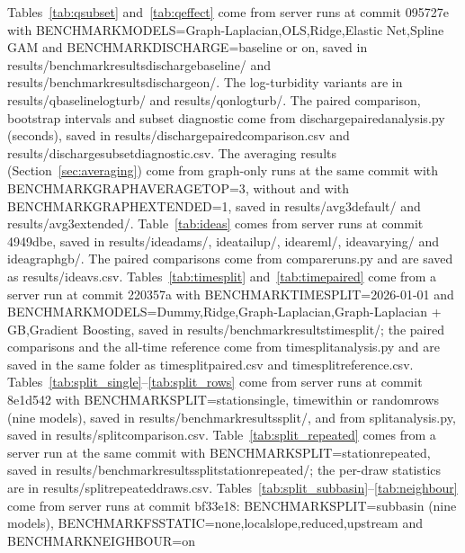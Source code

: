 \documentclass[11pt]{article}
\newcommand{\codeus}{\textunderscore\allowbreak}
\newcommand{\code}[1]{{\ttfamily\let\_\codeus #1}}
\begin{document}
Tables~\ref{tab:qsubset} and~\ref{tab:qeffect} come from server runs at commit \code{095727e}
with \code{BENCHMARK\_MODELS=Graph-Laplacian,OLS,Ridge,Elastic Net,Spline GAM} and
\code{BENCHMARK\_DISCHARGE=baseline} or \code{on}, saved in
\code{results/benchmark\_results\_discharge\_baseline/} and
\code{results/benchmark\_results\_discharge\_on/}. The log-turbidity variants are in
\code{results/q\_baseline\_logturb/} and \code{results/q\_on\_logturb/}. The paired comparison,
bootstrap intervals and subset diagnostic come from \code{discharge\_paired\_analysis.py} (seconds),
saved in \code{results/discharge\_paired\_comparison.csv} and
\code{results/discharge\_subset\_diagnostic.csv}. The averaging results (Section~\ref{sec:averaging})
come from graph-only runs at the same commit with \code{BENCHMARK\_GRAPH\_AVERAGE\_TOP=3}, without
and with \code{BENCHMARK\_GRAPH\_EXTENDED=1}, saved in \code{results/avg3\_default/} and
\code{results/avg3\_extended/}.
Table~\ref{tab:ideas} comes from server runs at commit \code{4949dbe}, saved in
\code{results/idea\_dams/}, \code{idea\_tailup/}, \code{idea\_reml/}, \code{idea\_varying/} and \code{idea\_graph\_gb/}. The paired comparisons come from
\code{compare\_runs.py} and are saved as \code{results/idea\_*\_vs\_*.csv}.
Tables~\ref{tab:timesplit} and~\ref{tab:timepaired} come from a server run at commit \code{220357a} with
\code{BENCHMARK\_TIME\_SPLIT=2026-01-01} and
\code{BENCHMARK\_MODELS=Dummy,Ridge,Graph-Laplacian,Graph-Laplacian + GB,Gradient Boosting}, saved in
\code{results/benchmark\_results\_time\_split/}; the paired comparisons and the all-time reference
come from \code{time\_split\_analysis.py} and are saved in the same folder as
\code{time\_split\_paired.csv} and \code{time\_split\_reference.csv}. Tables~\ref{tab:split_single}--\ref{tab:split_rows} come
from server runs at commit \code{8e1d542} with \code{BENCHMARK\_SPLIT=station\_single},
\code{time\_within} or \code{random\_rows} (nine models), saved in
\code{results/benchmark\_results\_split\_*/}, and from \code{split\_analysis.py}, saved in
\code{results/split\_comparison.csv}. Table~\ref{tab:split_repeated} comes from a server run at the
same commit with \code{BENCHMARK\_SPLIT=station\_repeated}, saved in
\code{results/benchmark\_results\_split\_station\_repeated/}; the per-draw statistics are in
\code{results/split\_repeated\_draws.csv}. Tables~\ref{tab:split_subbasin}--\ref{tab:neighbour}
come from server runs at commit \code{bf33e18}: \code{BENCHMARK\_SPLIT=subbasin} (nine models),
\code{BENCHMARK\_FS\_STATIC=none,local\_slope,reduced,upstream} and \code{BENCHMARK\_NEIGHBOUR=on}
\end{document}
